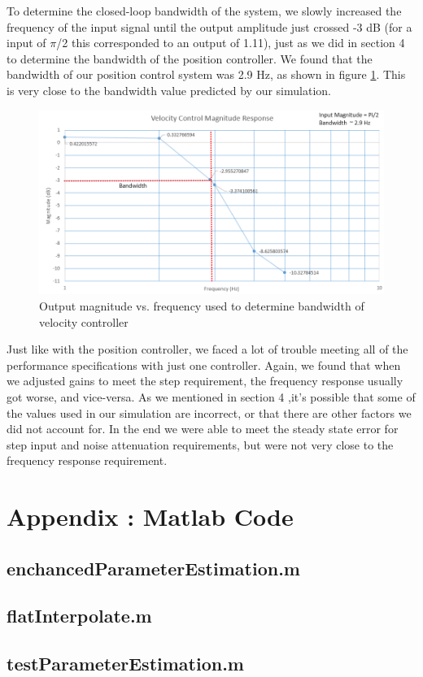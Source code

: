 \documentclass{article}
\theoremstyle{plain}
\theoremstyle{definition}
\theoremstyle{remark}
\begin{document}
To determine the closed-loop bandwidth of the system, we slowly increased the frequency of the input signal until the output amplitude just crossed -3 dB (for a input of $\pi$/2 this corresponded to an output of 1.11), just as we did in section 4 to determine the bandwidth of the position controller. We found that the bandwidth of our position control system was  2.9 Hz, as shown in figure \ref{VelBandwidth}. This is very close to the bandwidth value predicted by our simulation.\\

\begin{figure}[htb]
\begin{center}
\includegraphics[width = 14cm]{VelocityControl_Magnitude.png}
\caption{Output magnitude vs. frequency used to determine bandwidth of velocity controller}
\label{VelBandwidth}
\end{center}
\end{figure}

Just like with the position controller, we faced a lot of trouble meeting all of the performance specifications with just one controller. Again, we found that when we adjusted gains to meet the step requirement, the frequency response usually got worse, and vice-versa. As we mentioned in section 4 ,it's possible that some of the values used in our simulation are incorrect, or that there are other factors we did not account for. In the end we were able to meet the steady state error for step input and noise attenuation requirements, but were not very close to the frequency response requirement.\\

\clearpage

\section*{Appendix : Matlab Code}
\subsection*{enchancedParameterEstimation.m}


\subsection*{flatInterpolate.m}


\subsection*{testParameterEstimation.m}

\end{document}
